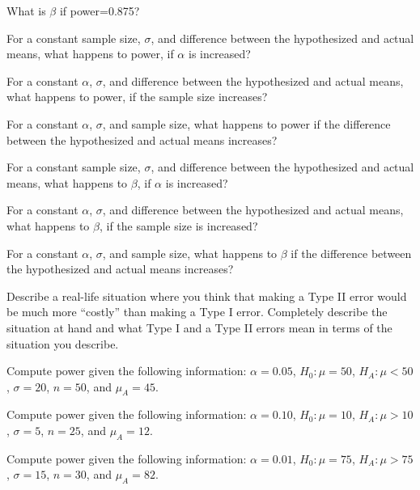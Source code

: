 \documentclass[10pt,openany]{book}\usepackage[]{graphicx}\usepackage[]{color}
\begin{document}

\begin{exsection}
  \item \label{revex:HypTPower1} What is $\beta$ if power=0.875? 
  \item \label{revex:HypTPowerAlpha} For a constant sample size, $\sigma$, and difference between the hypothesized and actual means, what happens to power, if $\alpha$ is increased?  
  \item \label{revex:HypTPowern} For a constant $\alpha$, $\sigma$, and difference between the hypothesized and actual means, what happens to power, if the sample size increases? 
  \item \label{revex:HypTPowerMu} For a constant $\alpha$, $\sigma$, and sample size, what happens to power if the difference between the hypothesized and actual means increases? 
  \item \label{revex:HypTBetaAlpha} For a constant sample size, $\sigma$, and difference between the hypothesized and actual means, what happens to $\beta$, if $\alpha$ is increased? 
  \item \label{revex:HypTBetan} For a constant $\alpha$, $\sigma$, and difference between the hypothesized and actual means, what happens to $\beta$, if the sample size is increased? 
  \item \label{revex:HypTBetaMu} For a constant $\alpha$, $\sigma$, and sample size, what happens to $\beta$ if the difference between the hypothesized and actual means increases? 
  \item \label{revex:HypTRealLife} Describe a real-life situation where you think that making a Type II error would be much more ``costly'' than making a Type I error.  Completely describe the situation at hand and what Type I and a Type II errors mean in terms of the situation you describe. 
  \item \label{revex:HypTCalcPwr1} Compute power given the following information: $\alpha=0.05$, $H_{0}:\mu=50$, $H_{A}:\mu<50$, $\sigma=20$, $n=50$, and $\mu_{A}=45$. 
  \item \label{revex:HypTCalcPwr2} Compute power given the following information: $\alpha=0.10$, $H_{0}:\mu=10$, $H_{A}:\mu>10$, $\sigma=5$, $n=25$, and $\mu_{A}=12$. 
  \item \label{revex:HypTCalcPwr3} Compute power given the following information: $\alpha=0.01$, $H_{0}:\mu=75$, $H_{A}:\mu>75$, $\sigma=15$, $n=30$, and $\mu_{A}=82$. 
\end{exsection}
\end{document}
